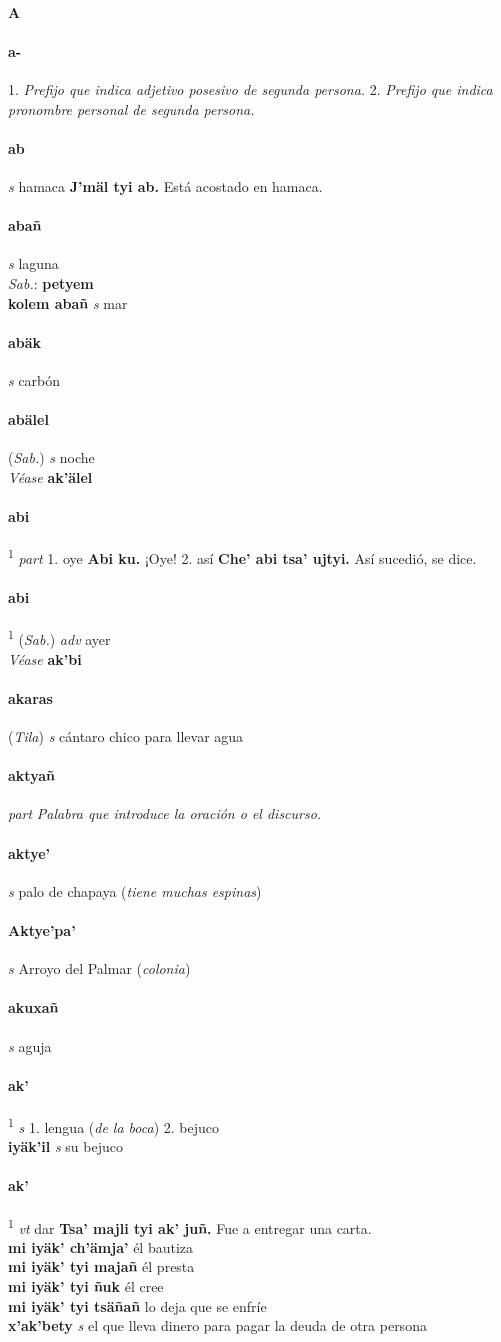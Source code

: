 \documentclass{scrbook}
\newcommand{\entry}[1]{\paragraph{#1}}
\newcommand{\maintitle}[1]{\end{multicols}\addchap{#1}\begin{multicols}{2}}
\newcommand{\alphaletter}[1]{\addsec{#1}}
\newcommand{\onedefinition}[1]{#1.}
\newcommand{\defsuperscript}[1]{\textsuperscript{1}}
\newcommand{\nontranslationdef}[1]{\textit{#1}}
\newcommand{\partofspeech}[1]{\textit{#1}}
\newcommand{\spanishtranslation}[1]{#1}
\newcommand{\clarification}[1]{(\textit{#1})}
\newcommand{\cholexample}[1]{\textbf{#1}}
\newcommand{\exampletranslation}[1]{#1}
\newcommand{\dialectvariant}[1]{\\\textit{#1}:}
\newcommand{\dialectword}[1]{\textbf{#1}}
\newcommand{\alsosee}[1]{\\\textit{Véase} \textbf{#1}}
\newcommand{\relevantdialect}[1]{(\textit{#1})}
\newcommand{\secondaryentry}[1]{\\\textbf{#1}}
\newcommand{\secondpartofspeech}[1]{\textit{#1}}
\newcommand{\secondtranslation}[1]{#1}
\begin{document}
\begin{multicols}{2}


\entry{A}
\maintitle{CH'OL — ESPAÑOL}
\alphaletter{A}

\entry{a-}
\onedefinition{1}
\nontranslationdef{Prefijo que indica adjetivo posesivo de segunda persona.}
\onedefinition{2}
\nontranslationdef{Prefijo que indica pronombre personal de segunda persona.}

\entry{ab}
\partofspeech{s}
\spanishtranslation{hamaca}
\cholexample{J'mäl tyi ab.}
\exampletranslation{Está acostado en hamaca.}

\entry{abañ}
\partofspeech{s}
\spanishtranslation{laguna}
\dialectvariant{Sab.}
\dialectword{petyem}
\secondaryentry{kolem abañ}
\secondpartofspeech{s}
\secondtranslation{mar}

\entry{abäk}
\partofspeech{s}
\spanishtranslation{carbón}

\entry{abälel}
\relevantdialect{Sab.}
\partofspeech{s}
\spanishtranslation{noche}
\alsosee{ak'älel}

\entry{abi}
\defsuperscript{1}
\partofspeech{part}
\onedefinition{1}
\spanishtranslation{oye}
\cholexample{Abi ku.}
\exampletranslation{¡Oye!}
\onedefinition{2}
\spanishtranslation{así}
\cholexample{Che' abi tsa' ujtyi.}
\exampletranslation{Así sucedió, se dice.}

\entry{abi}
\defsuperscript{2}
\relevantdialect{Sab.}
\partofspeech{adv}
\spanishtranslation{ayer}
\alsosee{ak'bi}

\entry{akaras}
\relevantdialect{Tila}
\partofspeech{s}
\spanishtranslation{cántaro chico para llevar agua}

\entry{aktyañ}
\partofspeech{part}
\nontranslationdef{Palabra que introduce la oración o el discurso.}

\entry{aktye'}
\partofspeech{s}
\spanishtranslation{palo de chapaya}
\clarification{tiene muchas espinas}

\entry{Aktye'pa'}
\partofspeech{s}
\spanishtranslation{Arroyo del Palmar}
\clarification{colonia}

\entry{akuxañ}
\partofspeech{s}
\spanishtranslation{aguja}

\entry{ak'}
\defsuperscript{1}
\partofspeech{s}
\onedefinition{1}
\spanishtranslation{lengua}
\clarification{de la boca}
\onedefinition{2}
\spanishtranslation{bejuco}
\secondaryentry{iyäk'il}
\secondpartofspeech{s}
\secondtranslation{su bejuco}

\entry{ak'}
\defsuperscript{2}
\partofspeech{vt}
\spanishtranslation{dar}
\cholexample{Tsa' majli tyi ak' juñ.}
\exampletranslation{Fue a entregar una carta.}
\secondaryentry{mi iyäk' ch'ämja'}
\secondtranslation{él bautiza}
\secondaryentry{mi iyäk' tyi majañ}
\secondtranslation{él presta}
\secondaryentry{mi iyäk' tyi ñuk}
\secondtranslation{él cree}
\secondaryentry{mi iyäk' tyi tsäñañ}
\secondtranslation{lo deja que se enfríe}
\secondaryentry{x'ak'bety}
\secondpartofspeech{s}
\secondtranslation{el que lleva dinero para pagar la deuda de otra persona}


\end{multicols}
\end{document}
